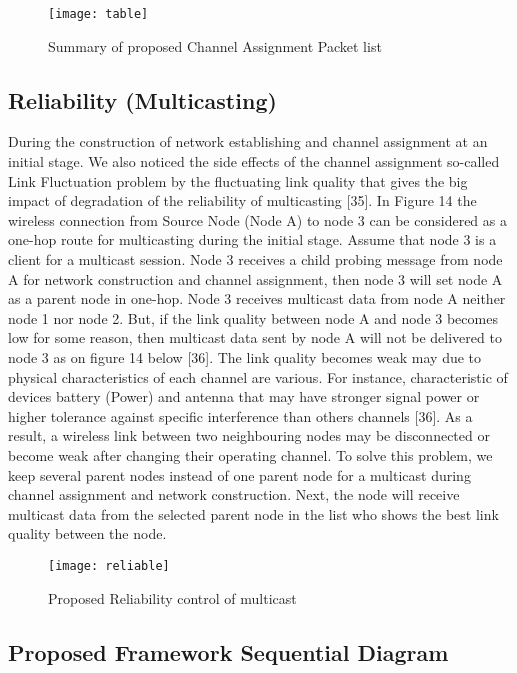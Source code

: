 \documentclass{article}
\begin{document}
\begin{center}
\begin{figure}[h]
\texttt{[image: table]}
\caption{Summary of proposed Channel Assignment Packet list}\label{table}
\end{figure}
\end{center}

\newpage
\subsection{Reliability (Multicasting)}
During the construction of network establishing and channel assignment at an initial stage. We also noticed the side effects of the channel assignment so-called Link Fluctuation problem by the fluctuating link quality that gives the big impact of degradation of the reliability of multicasting [35]. In Figure 14 the wireless connection from Source Node (Node A) to node 3 can be considered as a one-hop route for multicasting during the initial stage. Assume that node 3 is a client for a multicast session. Node 3 receives a child probing message from node A for network construction and channel assignment, then node 3 will set node A as a parent node in one-hop. Node 3 receives multicast data from node A neither node 1 nor node 2. But, if the link quality between node A and node 3 becomes low for some reason, then multicast data sent by node A will not be delivered to node 3 as on figure 14 below [36]. The link quality becomes weak may due to physical characteristics of each channel are various. For instance, characteristic of devices battery (Power) and antenna that may have stronger signal power or higher tolerance against specific interference than others channels [36]. As a result, a wireless link between two neighbouring nodes may be disconnected or become weak after changing their operating channel. To solve this problem, we keep several parent nodes instead of one parent node for a multicast during channel assignment and network construction. Next, the node will receive multicast data from the selected parent node in the list who shows the best link quality between the node.

\begin{center}
\begin{figure}[t]
\texttt{[image: reliable]}
\caption{Proposed Reliability control of multicast}\label{reliable}
\end{figure}
\end{center}

\subsection{Proposed Framework Sequential Diagram}
\end{document}
